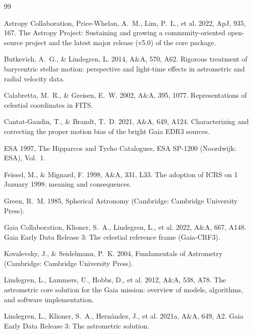 \documentclass[11pt]{article}
\begin{document}
\begin{thebibliography}{99}

Astropy Collaboration, Price-Whelan, A.~M., Lim, P.~L., et al. 2022, ApJ, 935, 167.
The Astropy Project: Sustaining and growing a community-oriented open-source
project and the latest major release (v5.0) of the core package.

Butkevich, A.~G., \& Lindegren, L. 2014, A\&A, 570, A62.
Rigorous treatment of barycentric stellar motion: perspective and light-time
effects in astrometric and radial velocity data.

Calabretta, M.~R., \& Greisen, E.~W. 2002, A\&A, 395, 1077.
Representations of celestial coordinates in FITS.

Cantat-Gaudin, T., \& Brandt, T.~D. 2021, A\&A, 649, A124.
Characterizing and correcting the proper motion bias of the bright Gaia EDR3
sources.

ESA 1997, The Hipparcos and Tycho Catalogues, ESA SP-1200 (Noordwijk: ESA),
Vol.~1.

Feissel, M., \& Mignard, F. 1998, A\&A, 331, L33.
The adoption of ICRS on 1 January 1998: meaning and consequences.

Green, R.~M. 1985, Spherical Astronomy (Cambridge: Cambridge University Press).

Gaia Collaboration, Klioner, S.~A., Lindegren, L., et al. 2022, A\&A, 667, A148.
Gaia Early Data Release 3: The celestial reference frame (Gaia-CRF3).

Kovalevsky, J., \& Seidelmann, P.~K. 2004, Fundamentals of Astrometry
(Cambridge: Cambridge University Press).

Lindegren, L., Lammers, U., Hobbs, D., et al. 2012, A\&A, 538, A78.
The astrometric core solution for the Gaia mission: overview of models,
algorithms, and software implementation.

Lindegren, L., Klioner, S.~A., Hern\'andez, J., et al. 2021a, A\&A, 649, A2.
Gaia Early Data Release 3: The astrometric solution.


\end{thebibliography}
\end{document}

